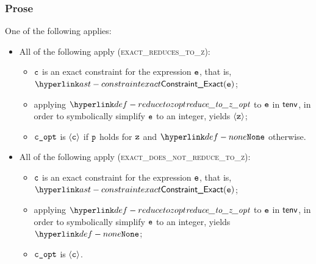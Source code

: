\subsubsection{Prose}
One of the following applies:
\begin{itemize}
  \item All of the following apply (\textsc{exact\_reduces\_to\_z}):
  \begin{itemize}
    \item $\texttt{c}$ is an exact constraint for the expression $\texttt{e}$, that is, $\ConstraintExact(\ve)$;
    \item applying $\reducetozopt$ to $\texttt{e}$ in $\textsf{tenv}$, in order to symbolically simplify $\texttt{e}$ to an integer,
          yields $\langle\texttt{z}\rangle$;
    \item $\texttt{c\_opt}$ is $\langle\texttt{c}\rangle$ if $\texttt{p}$ holds for $\texttt{z}$ and $\None$ otherwise.
  \end{itemize}

  \item All of the following apply (\textsc{exact\_does\_not\_reduce\_to\_z}):
  \begin{itemize}
    \item $\texttt{c}$ is an exact constraint for the expression $\texttt{e}$, that is, $\ConstraintExact(\ve)$;
    \item applying $\reducetozopt$ to $\texttt{e}$ in $\textsf{tenv}$, in order to symbolically simplify $\texttt{e}$ to an integer,
          yields $\None$;
    \item $\texttt{c\_opt}$ is $\langle\texttt{c}\rangle$.
  \end{itemize}


\end{itemize}
